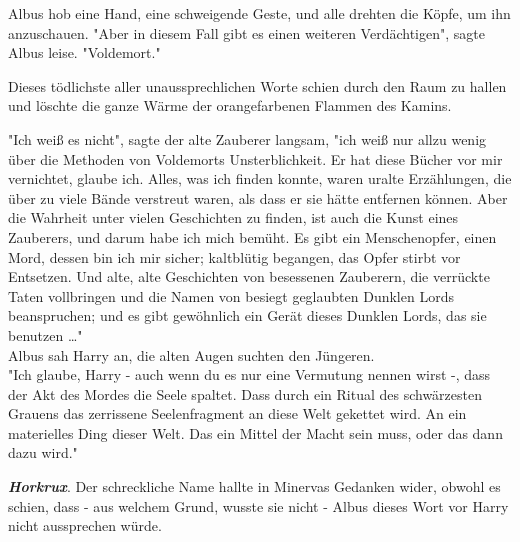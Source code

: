 {Albus hob eine Hand, eine schweigende Geste, und alle drehten die Köpfe, um ihn anzuschauen. "Aber in diesem Fall gibt es einen weiteren Verdächtigen", sagte Albus leise. "Voldemort."

Dieses tödlichste aller unaussprechlichen Worte schien durch den Raum zu hallen und löschte die ganze Wärme der orangefarbenen Flammen des Kamins.

"Ich weiß es nicht", sagte der alte Zauberer langsam, "ich weiß nur allzu wenig über die Methoden von Voldemorts Unsterblichkeit. Er hat diese Bücher vor mir vernichtet, glaube ich. Alles, was ich finden konnte, waren uralte Erzählungen, die über zu viele Bände verstreut waren, als dass er sie hätte entfernen können. Aber die Wahrheit unter vielen Geschichten zu finden, ist auch die Kunst eines Zauberers, und darum habe ich mich bemüht. Es gibt ein Menschenopfer, einen Mord, dessen bin ich mir sicher; kaltblütig begangen, das Opfer stirbt vor Entsetzen. Und alte, alte Geschichten von besessenen Zauberern, die verrückte Taten vollbringen und die Namen von besiegt geglaubten Dunklen Lords beanspruchen; und es gibt gewöhnlich ein Gerät dieses Dunklen Lords, das sie benutzen …"\\ Albus sah Harry an, die alten Augen suchten den Jüngeren.\\ "Ich glaube, Harry - auch wenn du es nur eine Vermutung nennen wirst -, dass der Akt des Mordes die Seele spaltet. Dass durch ein Ritual des schwärzesten Grauens das zerrissene Seelenfragment an diese Welt gekettet wird. An ein materielles Ding dieser Welt. Das ein Mittel der Macht sein muss, oder das dann dazu wird."

\textbf{\emph{Horkrux}}. Der schreckliche Name hallte in Minervas Gedanken wider, obwohl es schien, dass - aus welchem Grund, wusste sie nicht - Albus dieses Wort vor Harry nicht aussprechen würde.

}
